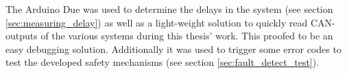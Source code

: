 \documentclass[ExampleMasters.tex]{subfiles}
\begin{document}
The Arduino Due was used to determine the delays in the system (see section \ref{sec:measuring_delay}) as well as a light-weight solution to quickly read \gls{CAN}-outputs of the various systems during this thesis' work. This proofed to be an easy debugging solution. Additionally it was used to trigger some error codes to test the developed safety mechanisms (see section \ref{sec:fault_detect_test}). 

\end{document}
